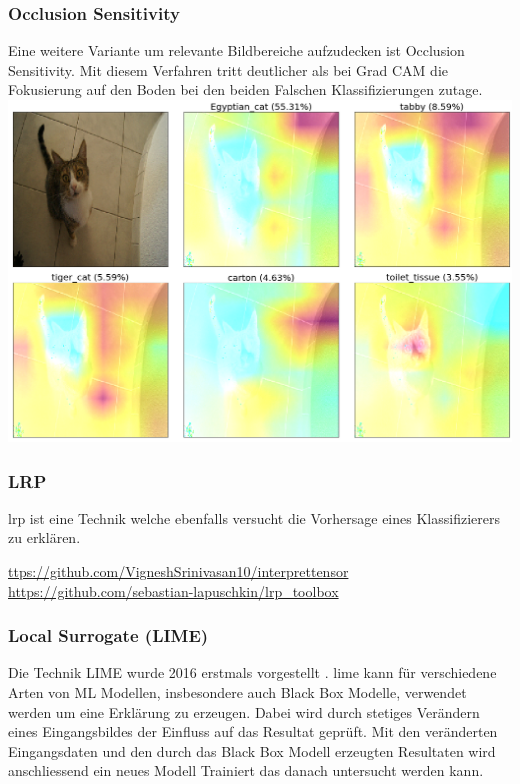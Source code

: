 \documentclass[
  12pt, %
  a4paper, %
  oneside, %
  openany, 
  numbers=noenddot, %
  BCOR=5mm, %
  parskip=half*, %
  thesis, %
]{bfhbook}
\begin{document}
\subsubsection*{Occlusion Sensitivity} \break
Eine weitere Variante um relevante Bildbereiche aufzudecken ist Occlusion Sensitivity. Mit diesem Verfahren tritt deutlicher als bei Grad CAM die Fokusierung auf den Boden bei den beiden Falschen Klassifizierungen zutage.
\includegraphics[width=\textwidth]{Bilder/OcclusionSensitivity-Classes.png}

\subsubsection*{LRP}
\acrfull{lrp} ist eine Technik welche ebenfalls versucht die Vorhersage eines Klassifizierers zu erklären. 

\url{ttps://github.com/VigneshSrinivasan10/interprettensor}
\url{https://github.com/sebastian-lapuschkin/lrp_toolbox}

\subsubsection*{Local Surrogate (LIME)}
\label{lime}
Die Technik LIME wurde 2016 erstmals vorgestellt \parencite{Ribeiro2016}. 
\Gls{lime} kann für verschiedene Arten von  \Gls{ML} Modellen, insbesondere auch Black Box Modelle, verwendet werden um eine Erklärung zu erzeugen. Dabei wird durch stetiges Verändern eines Eingangsbildes der Einfluss auf das Resultat geprüft. Mit den veränderten Eingangsdaten und den durch das Black Box Modell erzeugten Resultaten wird anschliessend ein neues Modell Trainiert das danach untersucht werden kann.
\end{document}
